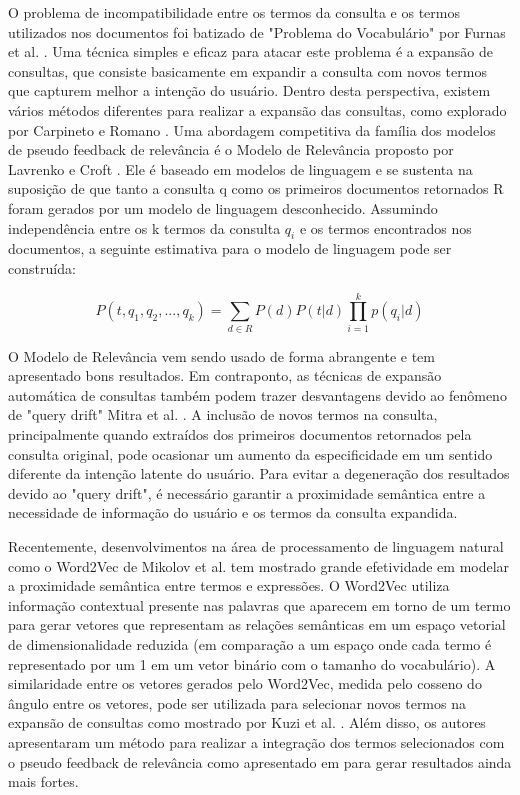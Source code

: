 \documentclass{article}
\begin{document}
O problema de incompatibilidade entre os termos da consulta e os termos utilizados nos documentos
foi batizado de "Problema do Vocabulário" por Furnas et al. \cite{furnas1987}. Uma técnica simples e eficaz para atacar 
este problema é a expansão de consultas, que consiste basicamente em expandir a consulta com novos termos que capturem
melhor a intenção do usuário. Dentro desta perspectiva, existem vários métodos diferentes para realizar a expansão das
consultas, como explorado por Carpineto e Romano \cite{carpineto2012}. Uma abordagem competitiva da família dos modelos
de pseudo feedback de relevância é o Modelo de Relevância proposto por Lavrenko e Croft \cite{lavrenko2001}. Ele é 
baseado em modelos de linguagem e se sustenta na suposição de que tanto a consulta q como os primeiros documentos retornados R 
foram gerados por um modelo de linguagem desconhecido.
Assumindo independência entre os k termos da consulta $ q_i $ e os termos encontrados nos documentos, 
a seguinte estimativa para o modelo de linguagem pode ser construída:

\begin{equation}\label{eq:relevance_model}
P(t, q_1, q_2, ..., q_k) = \sum_{d \in R} P(d)P(t|d) \prod_{i=1}^{k} p(q_i|d)
\end{equation}

O Modelo de Relevância vem sendo usado de forma abrangente e tem apresentado bons resultados. Em
contraponto, as técnicas de expansão automática de consultas também podem trazer desvantagens devido
ao fenômeno de "query drift" Mitra et al. \cite{mitra1998}. A inclusão de novos termos na consulta, principalmente
quando extraídos dos primeiros documentos retornados pela consulta original, pode ocasionar um aumento da 
especificidade em um sentido diferente da intenção latente do usuário. Para evitar a degeneração dos resultados
devido ao "query drift", é necessário garantir a proximidade semântica entre a necessidade de informação do usuário
e os termos da consulta expandida.

Recentemente, desenvolvimentos na área de processamento de linguagem natural como o Word2Vec de Mikolov et al. 
\cite{mikolov2013} tem mostrado grande efetividade em modelar a proximidade semântica entre termos e expressões.
O Word2Vec utiliza informação contextual presente nas palavras que aparecem em torno de um termo para gerar
vetores que representam as relações semânticas em um espaço vetorial de dimensionalidade reduzida (em comparação a
um espaço onde cada termo é representado por um 1 em um vetor binário com o tamanho do vocabulário).
A similaridade entre os vetores gerados pelo Word2Vec, medida pelo cosseno do ângulo entre os vetores, pode ser utilizada 
para selecionar novos termos na expansão 
de consultas como mostrado por Kuzi et al. \cite{kuzi2016}. Além disso, os autores apresentaram um método para
realizar a integração dos termos selecionados com o pseudo feedback de relevância como apresentado em \cite{lavrenko2001}
para gerar resultados ainda mais fortes.
\end{document}
